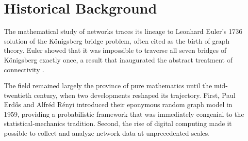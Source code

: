 \section{Historical Background}

The mathematical study of networks traces its lineage to Leonhard Euler's 1736 solution of the K\"{o}nigsberg bridge problem, often cited as the birth of graph theory. Euler showed that it was impossible to traverse all seven bridges of K\"{o}nigsberg exactly once, a result that inaugurated the abstract treatment of connectivity .

The field remained largely the province of pure mathematics until the mid-twentieth century, when two developments reshaped its trajectory. First, Paul Erd\H{o}s and Alfr\'{e}d R\'{e}nyi introduced their eponymous random graph model in 1959, providing a probabilistic framework that was immediately congenial to the statistical-mechanics tradition. Second, the rise of digital computing made it possible to collect and analyze network data at unprecedented scales.

